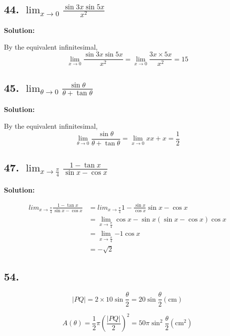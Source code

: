 \documentclass{article}
\newenvironment{solution}{
    \par \textbf{Solution: } \quad \par
}{\par}
\begin{document}
    \subsection*{44. $\lim_{x \to 0}\frac{\sin 3x \sin 5x}{x^2}$}

    \begin{solution}
        By the equivalent infinitesimal, $$\lim_{x \to 0}\frac{\sin 3x \sin 5x}{x^2} = \lim_{x \to 0}\frac{3x \times 5x}{x^2} = 15$$
    \end{solution}

    \subsection*{45. $\lim_{\theta \to 0}\frac{\sin \theta}{\theta + \tan \theta}$}

    \begin{solution}
        By the equivalent infinitesimal, $$\lim_{\theta \to 0}\frac{\sin \theta}{\theta + \tan \theta} = \lim_{x \to 0}{x}{x + x} = \frac 1 2$$
    \end{solution}

    \subsection*{47. $\lim_{x \to \frac \pi 4}\frac{1 - \tan x}{\sin x - \cos x}$}

    \begin{solution}
        $$
        \begin{aligned}
            lim_{x \to \frac \pi 4}\frac{1 - \tan x}{\sin x - \cos x} &= lim_{x \to \frac \pi 4}{1 - \frac{\sin x}{\cos x}}{\sin x - \cos x} \\
            &= \lim_{x \to \frac \pi 4}{\cos x - \sin x}{(\sin x - \cos x)\cos x} \\
            &= \lim_{x \to \frac \pi 4}{-1}{\cos x} \\
            &= -\sqrt 2
        \end{aligned}
        $$
    \end{solution}

    \subsection*{54. }

    $$|PQ| = 2 \times 10 \sin \frac{\theta}{2} = 20\sin \frac{\theta}{2}(\textrm{cm})$$

    $$A(\theta) = \frac 1 2 \pi (\frac{|PQ|}{2}) ^2 = 50\pi \sin ^2 \frac{\theta}{2}(\textrm{cm}^2)$$
\end{document}
